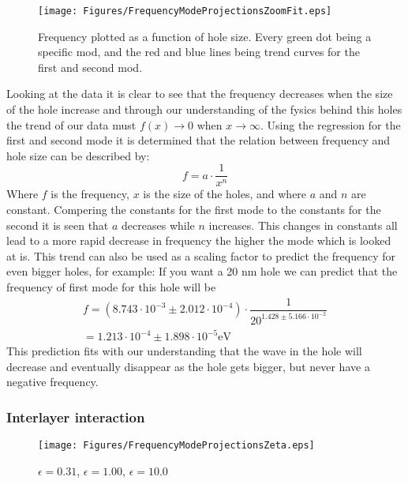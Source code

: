 \begin{figure}[H]
    \centering
    \texttt{[image: Figures/FrequencyModeProjectionsZoomFit.eps]}
    \caption{Frequency plotted as a function of hole size. Every green dot being a specific mod, and the red and blue lines being trend curves for the first and second mod.}
    \label{size vs frequency}
\end{figure}
\twocolumngrid
Looking at the data it is clear to see that the frequency decreases when the size of the hole increase and through our understanding of the fysics behind this holes the trend of our data must $f(x)\rightarrow0$ when $x\rightarrow\infty$. Using the regression for the first and second mode it is determined that the relation between frequency and hole size can be described by:
\begin{equation}
    f=a\cdot\dfrac{1}{x^n}
\end{equation}
Where $f$ is the frequency, $x$ is the size of the holes, and where $a$ and $n$ are constant. Compering the constants for the first mode to the constants for the second it is seen that $a$ decreases while $n$ increases. This changes in constants all lead to a more rapid decrease in frequency the higher the mode which is looked at is. This trend can also be used as a scaling factor to predict the frequency for even bigger holes, for example: If you want a 20 nm hole we can predict that the frequency of first mode for this hole will be
\begin{eqnarray*}
    f=\left(8.743\cdot10^{-3}\pm2.012\cdot10^{-4}\right)\cdot\dfrac{1}{20^{1.428\pm5.166\cdot10^{-2}}}\\=1.213\cdot10^{-4}\pm 1.898\cdot 10^{-5} \mathrm{eV}
\end{eqnarray*}
This prediction fits with our understanding that the wave in the hole will decrease and eventually disappear as the hole gets bigger, but never have a negative frequency.

\subsubsection{Interlayer interaction}
\onecolumngrid

\begin{figure}[H]
    \centering
    \texttt{[image: Figures/FrequencyModeProjectionsZeta.eps]}
    \caption{$\epsilon=0.31$, $\epsilon=1.00$, $\epsilon=10.0$}
    \label{}
\end{figure}
\twocolumngrid